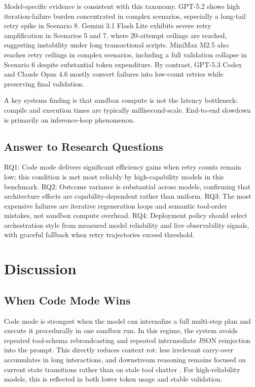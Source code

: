 \documentclass[journal,article,submit,pdftex,moreauthors]{Definitions/mdpi}
\begin{document}
Model-specific evidence is consistent with this taxonomy. GPT-5.2 shows high iteration-failure burden concentrated in complex scenarios, especially a long-tail retry spike in Scenario 8. Gemini 3.1 Flash Lite exhibits severe retry amplification in Scenarios 5 and 7, where 20-attempt ceilings are reached, suggesting instability under long transactional scripts. MiniMax M2.5 also reaches retry ceilings in complex scenarios, including a full validation collapse in Scenario 6 despite substantial token expenditure. By contrast, GPT-5.3 Codex and Claude Opus 4.6 mostly convert failures into low-count retries while preserving final validation.

A key systems finding is that sandbox compute is not the latency bottleneck: compile and execution times are typically millisecond-scale. End-to-end slowdown is primarily an inference-loop phenomenon.

\subsection{Answer to Research Questions}

RQ1: Code mode delivers significant efficiency gains when retry counts remain low; this condition is met most reliably by high-capability models in this benchmark. RQ2: Outcome variance is substantial across models, confirming that architecture effects are capability-dependent rather than uniform. RQ3: The most expensive failures are iterative regeneration loops and semantic tool-order mistakes, not sandbox compute overhead. RQ4: Deployment policy should select orchestration style from measured model reliability and live observability signals, with graceful fallback when retry trajectories exceed threshold.

\section{Discussion}

\subsection{When Code Mode Wins}

Code mode is strongest when the model can internalize a full multi-step plan and execute it procedurally in one sandbox run. In this regime, the system avoids repeated tool-schema rebroadcasting and repeated intermediate JSON reinjection into the prompt. This directly reduces context rot: less irrelevant carry-over accumulates in long interactions, and downstream reasoning remains focused on current state transitions rather than on stale tool chatter \cite{ref-code-survey}. For high-reliability models, this is reflected in both lower token usage and stable validation.
\end{document}
